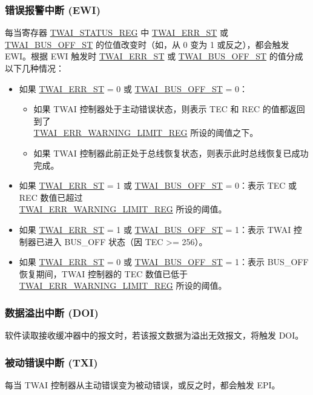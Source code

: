 \documentclass[main\_\_CN.tex]{subfiles}
\begin{document}
\subsubsection{错误报警中断 (EWI)}
每当寄存器 \hyperref[regdesc:TWAISTATUSREG]{TWAI\_STATUS\_REG} 中 \hyperref[fielddesc:TWAIERRST]{TWAI\_ERR\_ST} 或 \hyperref[fielddesc:TWAIBUSOFFST]{TWAI\_BUS\_OFF\_ST} 的位值改变时（如，从 0 变为 1 或反之），都会触发 EWI。根据 EWI 触发时 \hyperref[fielddesc:TWAIERRST]{TWAI\_ERR\_ST} 或 \hyperref[fielddesc:TWAIBUSOFFST]{TWAI\_BUS\_OFF\_ST} 的值分成以下几种情况：

\begin{itemize}
    \item 如果 \hyperref[fielddesc:TWAIERRST]{TWAI\_ERR\_ST} = 0 或 \hyperref[fielddesc:TWAIBUSOFFST]{TWAI\_BUS\_OFF\_ST} = 0：
    \begin{itemize}
        \item 如果 TWAI 控制器处于主动错误状态，则表示 TEC 和 REC 的值都返回到了 \\\hyperref[regdesc:TWAIERRWARNINGLIMITREG]{TWAI\_ERR\_WARNING\_LIMIT\_REG} 所设的阈值之下。
        \item 如果 TWAI 控制器此前正处于总线恢复状态，则表示此时总线恢复已成功完成。
    \end{itemize}
    \item 如果 \hyperref[fielddesc:TWAIERRST]{TWAI\_ERR\_ST} = 1 或 \hyperref[fielddesc:TWAIBUSOFFST]{TWAI\_BUS\_OFF\_ST} = 0：表示 TEC 或 REC 数值已超过 \\\hyperref[regdesc:TWAIERRWARNINGLIMITREG]{TWAI\_ERR\_WARNING\_LIMIT\_REG} 所设的阈值。
    \item 如果 \hyperref[fielddesc:TWAIERRST]{TWAI\_ERR\_ST} = 1 或 \hyperref[fielddesc:TWAIBUSOFFST]{TWAI\_BUS\_OFF\_ST} = 1：表示 TWAI 控制器已进入 BUS\_OFF 状态（因 TEC >= 256）。
    \item 如果 \hyperref[fielddesc:TWAIERRST]{TWAI\_ERR\_ST} = 0 或 \hyperref[fielddesc:TWAIBUSOFFST]{TWAI\_BUS\_OFF\_ST} = 1：表示 BUS\_OFF 恢复期间，TWAI 控制器的 TEC 数值已低于 \hyperref[regdesc:TWAIERRWARNINGLIMITREG]{TWAI\_ERR\_WARNING\_LIMIT\_REG} 所设的阈值。
\end{itemize}

\subsubsection{数据溢出中断 (DOI)}
软件读取接收缓冲器中的报文时，若该报文数据为溢出无效报文，将触发 DOI。

\subsubsection{被动错误中断 (TXI)}
每当 TWAI 控制器从主动错误变为被动错误，或反之时，都会触发 EPI。
\end{document}
